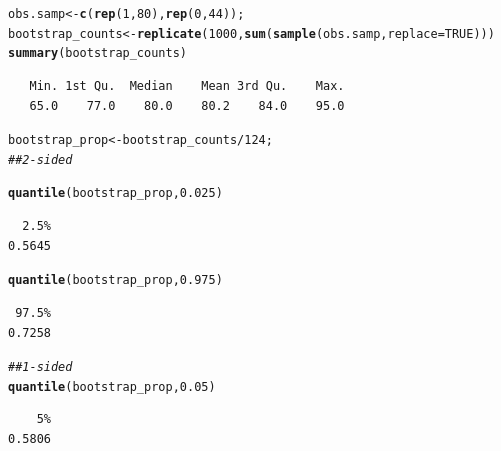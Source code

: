 \documentclass{beamer}\usepackage[]{graphicx}\usepackage[]{color}
\makeatletter
\newcommand{\hlnum}[1]{\textcolor[rgb]{0.2,0.2,0.2}{#1}}%
\newcommand{\hlcom}[1]{\textcolor[rgb]{0.302,0.302,0.302}{\textit{#1}}}%
\newcommand{\hlopt}[1]{\textcolor[rgb]{0.102,0.102,0.102}{#1}}%
\newcommand{\hlstd}[1]{\textcolor[rgb]{0.102,0.102,0.102}{#1}}%
\newcommand{\hlkwb}[1]{\textcolor[rgb]{0.102,0.102,0.102}{#1}}%
\newcommand{\hlkwc}[1]{\textcolor[rgb]{0.2,0.2,0.2}{#1}}%
\newcommand{\hlkwd}[1]{\textcolor[rgb]{0.102,0.102,0.102}{\textbf{#1}}}%
\newenvironment{kframe}{%
 \def\at@end@of@kframe{}%
 \ifinner\ifhmode%
  \def\at@end@of@kframe{\end{minipage}}%
  \begin{minipage}{\columnwidth}%
 \fi\fi%
 \def\FrameCommand##1{\hskip\@totalleftmargin \hskip-\fboxsep
 \colorbox{shadecolor}{##1}\hskip-\fboxsep
     \hskip-\linewidth \hskip-\@totalleftmargin \hskip\columnwidth}%
 \MakeFramed {\advance\hsize-\width
   \@totalleftmargin\z@ \linewidth\hsize
   \@setminipage}}%
 {\par\unskip\endMakeFramed%
 \at@end@of@kframe}
\newenvironment{knitrout}{}{} %
\renewenvironment{knitrout}{\begin{spacing}{0.75}\begin{tiny}}{\end{tiny}\end{spacing}}
\makeatother
\begin{document}
\begin{frame}[fragile]



\begin{knitrout}\small
{}\color{fgcolor}\begin{kframe}
\begin{alltt}
\hlstd{obs.samp} \hlkwb{<-} \hlkwd{c}\hlstd{(}\hlkwd{rep}\hlstd{(}\hlnum{1}\hlstd{,}\hlnum{80}\hlstd{),} \hlkwd{rep}\hlstd{(}\hlnum{0}\hlstd{,} \hlnum{44}\hlstd{));}
\hlstd{bootstrap_counts} \hlkwb{<-} \hlkwd{replicate}\hlstd{(}\hlnum{1000}\hlstd{,} \hlkwd{sum}\hlstd{(}\hlkwd{sample}\hlstd{(obs.samp,} \hlkwc{replace}\hlstd{=}\hlnum{TRUE}\hlstd{)))}
\hlkwd{summary}\hlstd{(bootstrap_counts)}
\end{alltt}
\begin{verbatim}
   Min. 1st Qu.  Median    Mean 3rd Qu.    Max. 
   65.0    77.0    80.0    80.2    84.0    95.0 
\end{verbatim}
\begin{alltt}
\hlstd{bootstrap_prop} \hlkwb{<-} \hlstd{bootstrap_counts}\hlopt{/}\hlnum{124}\hlstd{;}
\hlcom{## 2-sided}

\hlkwd{quantile}\hlstd{(bootstrap_prop,} \hlnum{0.025}\hlstd{)}
\end{alltt}
\begin{verbatim}
  2.5% 
0.5645 
\end{verbatim}
\begin{alltt}
\hlkwd{quantile}\hlstd{(bootstrap_prop,} \hlnum{0.975}\hlstd{)}
\end{alltt}
\begin{verbatim}
 97.5% 
0.7258 
\end{verbatim}
\begin{alltt}
\hlcom{## 1-sided}
\hlkwd{quantile}\hlstd{(bootstrap_prop,} \hlnum{0.05}\hlstd{)}
\end{alltt}
\begin{verbatim}
    5% 
0.5806 
\end{verbatim}
\end{kframe}
\end{knitrout}

\end{frame}
\end{document}
